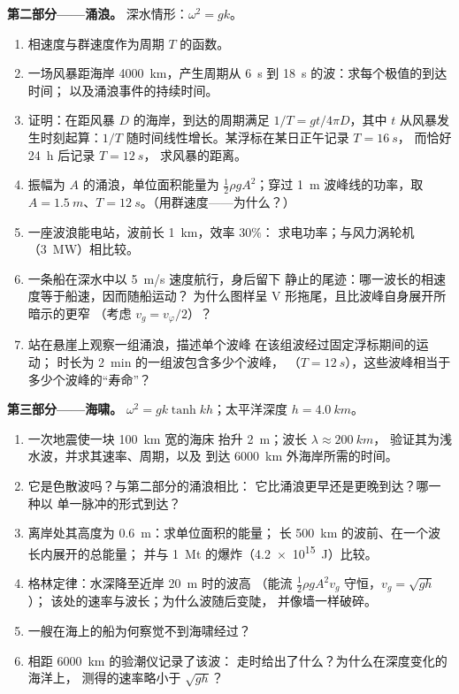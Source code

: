 \begin{problem}
\medskip
\noindent\textbf{第二部分——涌浪。}
深水情形：$\omega^2 = gk$。
\begin{enumerate}[resume]
  \item 相速度与群速度作为周期 $T$ 的函数。
  \item 一场风暴距海岸 \qty{4000}{km}，产生周期从
        \qty{6}{s} 到 \qty{18}{s} 的波：求每个极值的到达时间；
        以及涌浪事件的持续时间。
  \item 证明：在距风暴 $D$ 的海岸，到达的周期满足
        $1/T = gt/4\pi D$，其中 $t$ 从风暴发生时刻起算：$1/T$
        随时间线性增长。某浮标在某日正午记录 $T = \qty{16}{s}$，
        而恰好 \qty{24}{h} 后记录 $T = \qty{12}{s}$，
        求风暴的距离。
  \item 振幅为 $A$ 的涌浪，单位面积能量为 $\tfrac12\rho
        gA^2$；穿过 \qty{1}{m} 波峰线的功率，取 $A =
        \qty{1.5}{m}$、$T = \qty{12}{s}$。（用群速度——为什么？）
  \item 一座波浪能电站，波前长 \qty{1}{km}，效率 $30\%$：
        求电功率；与风力涡轮机（\qty{3}{MW}）相比较。
  \item 一条船在深水中以 \qty{5}{m/s} 速度航行，身后留下
        静止的尾迹：哪一波长的相速度等于船速，因而随船运动？
        为什么图样呈
        V 形拖尾，且比波峰自身展开所暗示的更窄
        （考虑 $v_g = v_\varphi/2$）？
  \item 站在悬崖上观察一组涌浪，描述单个波峰
        在该组波经过固定浮标期间的运动；
        时长为 \qty{2}{min} 的一组波包含多少个波峰，
        （$T = \qty{12}{s}$），这些波峰相当于
        多少个波峰的“寿命”？
\end{enumerate}

\medskip
\noindent\textbf{第三部分——海啸。}
$\omega^2 = gk\tanh kh$；太平洋深度 $h = \qty{4.0}{km}$。
\begin{enumerate}[resume]
  \item 一次地震使一块 \qty{100}{km} 宽的海床
        抬升 \qty{2}{m}；波长 $\lambda \approx \qty{200}{km}$，
        验证其为浅水波，并求其速率、周期，以及
        到达 \qty{6000}{km} 外海岸所需的时间。
  \item 它是色散波吗？与第二部分的涌浪相比：
        它比涌浪更早还是更晚到达？哪一种以
        单一脉冲的形式到达？
  \item 离岸处其高度为 \qty{0.6}{m}：求单位面积的能量；
        长 \qty{500}{km} 的波前、在一个波长内展开的总能量；
        并与 \qty{1}{Mt} 的爆炸（\qty{4.2e15}{J}）比较。
  \item 格林定律：水深降至近岸 \qty{20}{m} 时的波高
        （能流 $\tfrac12\rho gA^2v_g$ 守恒，$v_g = \sqrt{gh}$）；
        该处的速率与波长；为什么波随后变陡，
        并像墙一样破碎。
  \item 一艘在海上的船为何察觉不到海啸经过？
  \item 相距 \qty{6000}{km} 的验潮仪记录了该波：
        走时给出了什么？为什么在深度变化的海洋上，
        测得的速率略小于 $\sqrt{gh}$？
\end{enumerate}


\end{problem}
